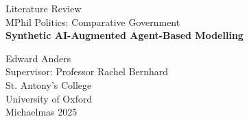 \begin{titlepage}
\thispagestyle{empty}
\centering
\vspace*{6em}

{\LARGE  Literature Review\\[1em]}
{\LARGE MPhil Politics: Comparative Government \\[2em]}
{\Large \textbf{Synthetic AI-Augmented Agent-Based Modelling}\\[2em]}


{\Large Edward Anders \\[0.5em]}
Supervisor: Professor Rachel Bernhard \\[1em]
St. Antony's College \\
University of Oxford \\[1em]

Michaelmas 2025

\vfill

\end{titlepage}
\newpage